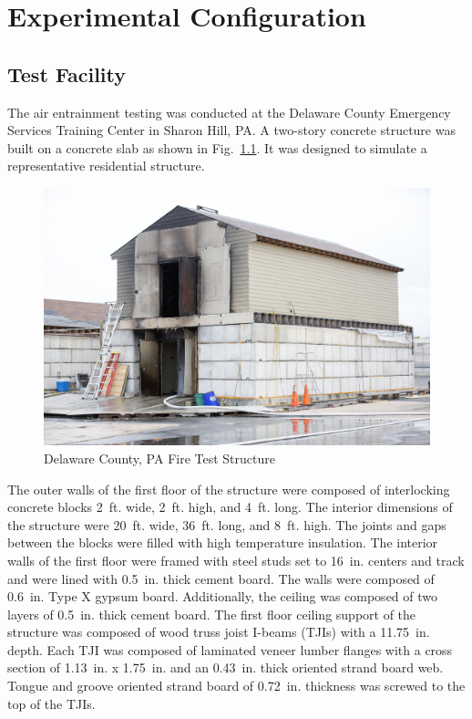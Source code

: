 \documentclass[12pt,oneside]{book}
\begin{document}
\chapter{Experimental Configuration}

\section{Test Facility}

The air entrainment testing was conducted at the Delaware County Emergency Services Training Center in Sharon Hill, PA. A two-story concrete structure was built on a concrete slab as shown in Fig.~\ref{fig:Delaware_County,_PA_Fire_Test_Structure}. It was designed to simulate a representative residential structure. 

\begin{figure}[!ht]
	\centering
	\includegraphics[width=\columnwidth]{Figures/Air_Entrainment/delcocorner.jpg}
	\caption{Delaware County, PA Fire Test Structure}
	\label{fig:Delaware_County,_PA_Fire_Test_Structure}
\end{figure}

The outer walls of the first floor of the structure were composed of interlocking concrete blocks 2~ft. wide, 2~ft. high, and 4~ft. long. The interior dimensions of the structure were 20~ft. wide, 36~ft. long, and 8~ft. high. The joints and gaps between the blocks were filled with high temperature insulation. The interior walls of the first floor were framed with steel studs set to 16~in. centers and track and were lined with 0.5~in. thick cement board. The walls were composed of 0.6~in. Type X gypsum board. Additionally, the ceiling was composed of two layers of 0.5~in. thick cement board. The first floor ceiling support of the structure was composed of wood truss joist I-beams (TJIs) with a 11.75~in. depth. Each TJI was composed of laminated veneer lumber flanges with a cross section of 1.13~in. x 1.75~in. and an 0.43~in. thick oriented strand board web. Tongue and groove oriented strand board of 0.72~in. thickness was screwed to the top of the TJIs. 
\end{document}
